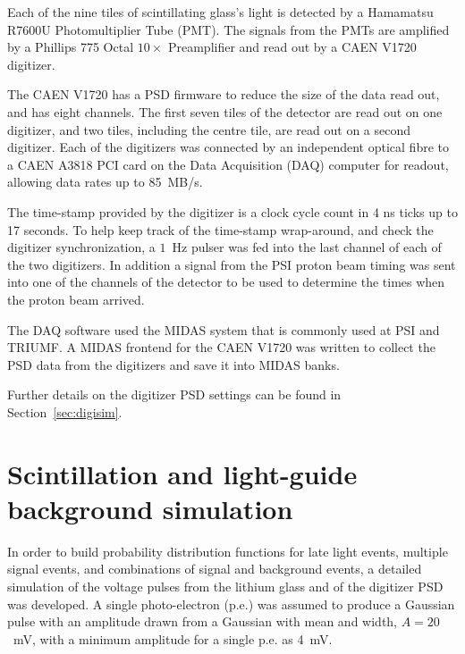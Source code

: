 \documentclass[letter,twocolumn,preprint,3p,numbers,sort&compress]{elsarticle}
\begin{document}
Each of the nine tiles of scintillating glass's light is detected by a
Hamamatsu R7600U Photomultiplier Tube (PMT).  The signals from the
PMTs are amplified by a Phillips 775 Octal $10\times$ Preamplifier and
read out by a CAEN V1720 digitizer.

The CAEN V1720 has a PSD firmware to reduce the size of the data read
out, and has eight channels.  The first seven tiles of the detector
are read out on one digitizer, and two tiles, including the centre
tile, are read out on a second digitizer.  Each of the digitizers was
connected by an independent optical fibre to a CAEN A3818 PCI card on
the Data Acquisition (DAQ) computer for readout, allowing data rates
up to 85~MB/s.

The time-stamp provided by the digitizer is a clock cycle count in 4 ns
ticks up to 17 seconds.  To help keep track of the time-stamp
wrap-around, and check the digitizer synchronization, a $1$~Hz pulser
was fed into the last channel of each of the two digitizers.  In
addition a signal from the PSI proton beam timing was sent into one of
the channels of the detector to be used to determine the times when
the proton beam arrived.

The DAQ software used the MIDAS system that is commonly used at PSI
and TRIUMF.  A MIDAS frontend for the CAEN V1720 was written to
collect the PSD data from the digitizers and save it into MIDAS banks.

Further details on the digitizer PSD settings can be found in
Section~\ref{sec:digisim}.  


\section{ Scintillation and light-guide background simulation }\label{sec:sim}

In order to build probability distribution functions for late light
events, multiple signal events, and combinations of signal and
background events, a detailed simulation of the voltage pulses from
the lithium glass and of the digitizer PSD was developed.  A single
photo-electron (p.e.) was assumed to produce a Gaussian pulse with an
amplitude drawn from a Gaussian with mean and width, $A=20$~mV, with a
minimum amplitude for a single p.e. as 4~mV.
\end{document}
